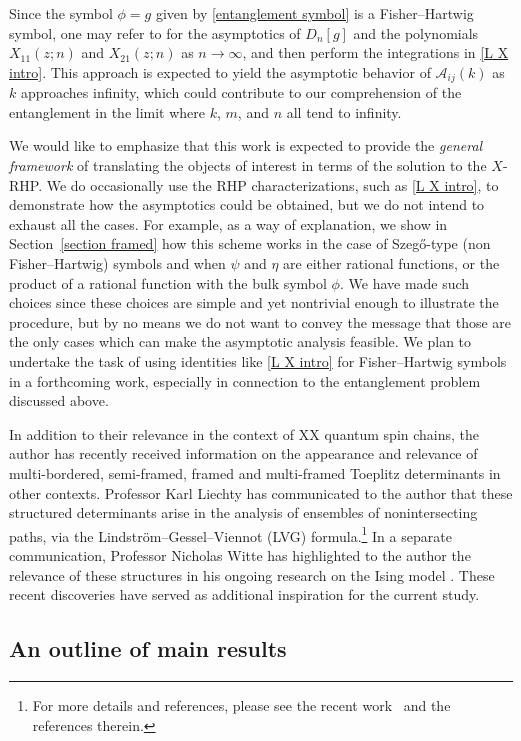 \documentclass[10pt,a4paper]{amsart}
\numberwithin{equation}{section}
\begin{document}
	Since the symbol $\phi=g$ given by \eqref{entanglement symbol} is a Fisher--Hartwig symbol, one may refer to \cite{DIK} for the asymptotics of $D_{n}[g]$ and the polynomials $X_{11}(z;n)$ and $X_{21}(z;n)$ as $n \to \infty$, and then perform the integrations in \eqref{L X intro}. This approach is expected to yield the asymptotic behavior of $\mathscr{A}_{ij}(k)$ as $k$ approaches infinity, which could contribute to our comprehension of the entanglement in the limit where $k$, $m$, and $n$ all tend to infinity.
	
	
	We would like to emphasize that this work is expected to provide the \textit{general framework} of translating the objects of interest in terms of the solution to the $X$-RHP. We do occasionally use the RHP characterizations, such as \eqref{L X intro}, to demonstrate how the asymptotics could be obtained, but we do not intend to exhaust all the cases. For example, as a way of explanation, we show in Section~\ref{section framed} how this scheme works in the case of Szeg\H{o}-type (non Fisher--Hartwig) symbols and when $\psi$ and $\eta$ are either rational functions, or the product of a rational function with the bulk symbol $\phi$. We have made such choices since these choices are simple and yet nontrivial enough to illustrate the procedure, but by no means we do not want to convey the message that those are the only cases which can make the asymptotic analysis feasible. We plan to undertake the task of using identities like \eqref{L X intro} for Fisher--Hartwig symbols in a forthcoming work, especially in connection to the entanglement problem discussed above.
	
	In addition to their relevance in the context of XX quantum spin chains, the author has recently received information on the appearance and relevance of multi-bordered, semi-framed, framed and multi-framed Toeplitz determinants in other contexts. Professor Karl Liechty has communicated to the author that these structured determinants arise in the analysis of ensembles of nonintersecting paths, via the Lindstr\"om--Gessel--Viennot (LVG) formula.\footnote{For more details and references, please see the recent work~\cite{GL24} and the references therein.} In a separate communication, Professor Nicholas Witte has highlighted to the author the relevance of these structures in his ongoing research on the Ising model \cite{W}. These recent discoveries have served as additional inspiration for the current study.	
	
\subsection{An outline of main results}
	
\end{document}
